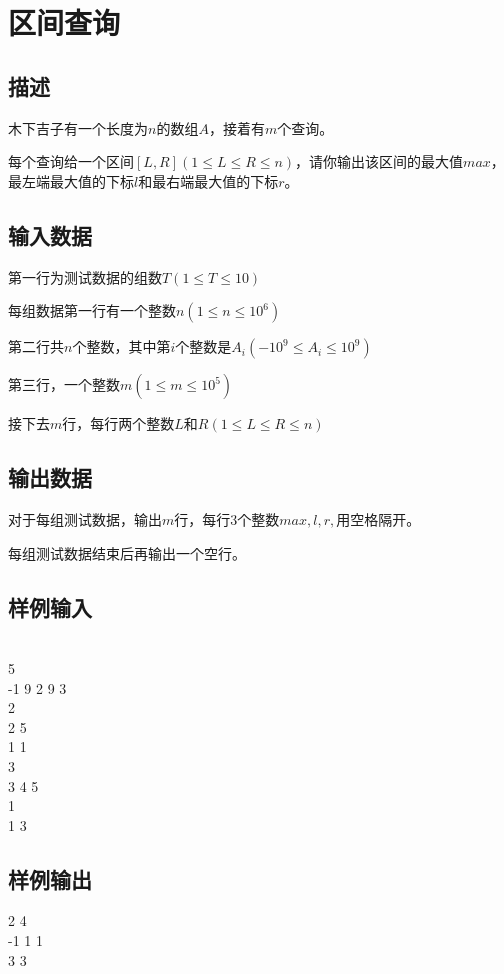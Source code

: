 \ifx\allfiles\undefined

\fi


\section{区间查询}
\subsection*{描述}
木下吉子有一个长度为$n$的数组$A$，接着有$m$个查询。

每个查询给一个区间$[L,R](1\leqslant L\leqslant R\leqslant n)$，请你输出该区间的最大值$max$，最左端最大值的下标$l$和最右端最大值的下标$r$。

\subsection*{输入数据}
第一行为测试数据的组数$T(1\leqslant T\leqslant 10)$

每组数据第一行有一个整数$n(1\leqslant n\leqslant 10^6)$

第二行共$n$个整数，其中第$i$个整数是$A_i(-10^9\leqslant A_i\leqslant 10^9)$

第三行，一个整数$m(1\leqslant m\leqslant 10^5)$

接下去$m$行，每行两个整数$L$和$R(1\leqslant L\leqslant R\leqslant n)$

\subsection*{输出数据}
对于每组测试数据，输出$m$行，每行3个整数$max,l,r,$用空格隔开。

每组测试数据结束后再输出一个空行。

\subsection*{样例输入}
\\
5\\
-1 9 2 9 3\\
2\\
2 5\\
1 1\\
3\\
3 4 5\\
1\\
1 3

\subsection*{样例输出}
 2 4\\
-1 1 1\\

 3 3


\ifx\allfiles\undefined

\fi
